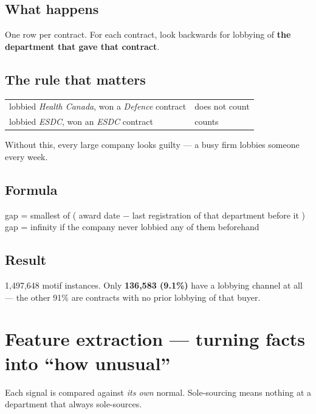 \documentclass[11pt,a4paper]{article}
\begin{document}
\subsection*{What happens}
One row per contract. For each contract, look backwards for lobbying of
\textbf{the department that gave that contract}.

\subsection*{The rule that matters}
\begin{center}\small
\begin{tabular}{@{}ll@{}}
\toprule
lobbied \emph{Health Canada}, won a \emph{Defence} contract & \textcolor{mulberry}{does not count} \\
lobbied \emph{ESDC}, won an \emph{ESDC} contract & \textcolor{pine}{counts} \\
\bottomrule
\end{tabular}
\end{center}

Without this, every large company looks guilty --- a busy firm lobbies someone every week.

\subsection*{Formula}
\begin{center}\ttfamily\small
gap = smallest of ( award date $-$ last registration of that department before it )\\[2pt]
gap = infinity if the company never lobbied any of them beforehand
\end{center}

\subsection*{Result}
1{,}497{,}648 motif instances. Only \textbf{136{,}583 (9.1\%)} have a lobbying channel
at all --- the other 91\% are contracts with no prior lobbying of that buyer.

\section{Feature extraction --- turning facts into ``how unusual''}

Each signal is compared against \emph{its own} normal. Sole-sourcing means nothing at a
department that always sole-sources.
\end{document}
